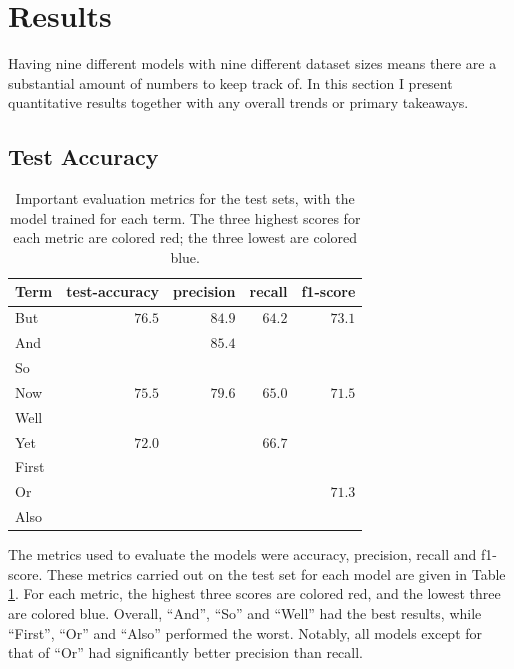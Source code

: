 \section{Results}

Having nine different models with nine different dataset sizes means there are a substantial amount of numbers to keep track of. In this section I present quantitative results together with any overall trends or primary takeaways.

\subsection{Test Accuracy}

\begin{table}[h]
\centering
 \begin{tabular}{|| l | r | r | r | r ||}
 \hline
 Term & test-accuracy & precision & recall & f1-score \\ [0.3ex] 
 \hline\hline
 But & $76.5$ & $84.9$ & $64.2$ & $73.1$ \\
 \hline
 And & \color{red}{$78.6$} & $85.4$ & \color{red}{$70.8$} & \color{red}{$77.4$} \\
 \hline
 So & \color{red}{$77.1$} & \color{red}{$87.5$} & \color{blue}{$63.4$} & \color{red}{$73.5$} \\
 \hline
 Now & $75.5$ & $79.6$ & $65.0$ & $71.5$ \\
 \hline
 Well & \color{red}{$85.5$} & \color{red}{$91.9$} & \color{red}{$79.8$} & \color{red}{$85.5$} \\
 \hline
 Yet & $72.0$ & \color{blue}{$74.1$} & $66.7$ & \color{blue}{$70.2$} \\
 \hline
 First & \color{blue}{$69.4$} & \color{red}{$93.8$} & \color{blue}{$49.2$} & \color{blue}{$64.5$} \\
 \hline
 Or & \color{blue}{$70.7$} & \color{blue}{$67.2$} & \color{red}{$76.0$} & $71.3$ \\
 \hline
 Also & \color{blue}{$57.4$} & \color{blue}{$62.8$} & \color{blue}{$43.2$} & \color{blue}{$51.2$} \\
 \hline
\end{tabular}
\caption{Important evaluation metrics for the test sets, with the model trained for each term. The three highest scores for each metric are colored red; the three lowest are colored blue.}
\label{disc-mark-test-results}
\end{table}

The metrics used to evaluate the models were accuracy, precision, recall and f1-score. These metrics carried out on the test set for each model are given in Table \ref{disc-mark-test-results}. For each metric, the highest three scores are colored red, and the lowest three are colored blue. Overall, ``And'', ``So'' and ``Well'' had the best results, while ``First'', ``Or'' and ``Also'' performed the worst. Notably, all models except for that of ``Or'' had significantly better precision than recall. 

